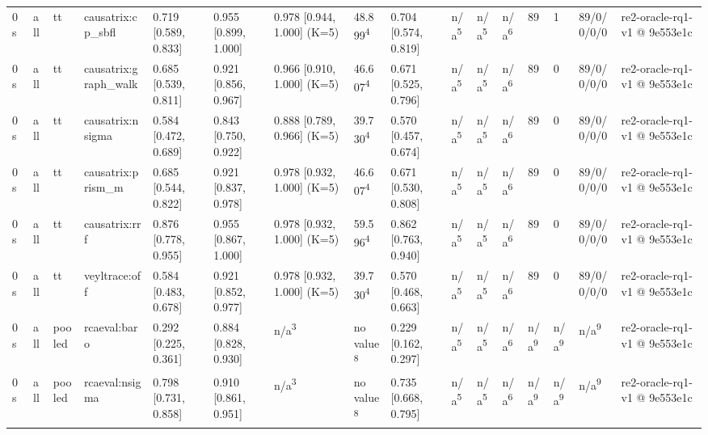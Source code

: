 \begin{table}[t]
\begin{tabular}{llllllllllllllll}
0 s & all & tt & causatrix:cp\_sbfl & 0.719 [0.589, 0.833] & 0.955 [0.899, 1.000] & 0.978 [0.944, 1.000] (K=5) & 48.899\textsuperscript{4} & 0.704 [0.574, 0.819] & n/a\textsuperscript{5} & n/a\textsuperscript{5} & n/a\textsuperscript{6} & 89 & 1 & 89/0/0/0/0 & re2-oracle-rq1-v1 @ 9e553e1c \\
0 s & all & tt & causatrix:graph\_walk & 0.685 [0.539, 0.811] & 0.921 [0.856, 0.967] & 0.966 [0.910, 1.000] (K=5) & 46.607\textsuperscript{4} & 0.671 [0.525, 0.796] & n/a\textsuperscript{5} & n/a\textsuperscript{5} & n/a\textsuperscript{6} & 89 & 0 & 89/0/0/0/0 & re2-oracle-rq1-v1 @ 9e553e1c \\
0 s & all & tt & causatrix:nsigma & 0.584 [0.472, 0.689] & 0.843 [0.750, 0.922] & 0.888 [0.789, 0.966] (K=5) & 39.730\textsuperscript{4} & 0.570 [0.457, 0.674] & n/a\textsuperscript{5} & n/a\textsuperscript{5} & n/a\textsuperscript{6} & 89 & 0 & 89/0/0/0/0 & re2-oracle-rq1-v1 @ 9e553e1c \\
0 s & all & tt & causatrix:prism\_m & 0.685 [0.544, 0.822] & 0.921 [0.837, 0.978] & 0.978 [0.932, 1.000] (K=5) & 46.607\textsuperscript{4} & 0.671 [0.530, 0.808] & n/a\textsuperscript{5} & n/a\textsuperscript{5} & n/a\textsuperscript{6} & 89 & 0 & 89/0/0/0/0 & re2-oracle-rq1-v1 @ 9e553e1c \\
0 s & all & tt & causatrix:rrf & 0.876 [0.778, 0.955] & 0.955 [0.867, 1.000] & 0.978 [0.932, 1.000] (K=5) & 59.596\textsuperscript{4} & 0.862 [0.763, 0.940] & n/a\textsuperscript{5} & n/a\textsuperscript{5} & n/a\textsuperscript{6} & 89 & 0 & 89/0/0/0/0 & re2-oracle-rq1-v1 @ 9e553e1c \\
0 s & all & tt & veyltrace:off & 0.584 [0.483, 0.678] & 0.921 [0.852, 0.977] & 0.978 [0.932, 1.000] (K=5) & 39.730\textsuperscript{4} & 0.570 [0.468, 0.663] & n/a\textsuperscript{5} & n/a\textsuperscript{5} & n/a\textsuperscript{6} & 89 & 0 & 89/0/0/0/0 & re2-oracle-rq1-v1 @ 9e553e1c \\
0 s & all & pooled & rcaeval:baro & 0.292 [0.225, 0.361] & 0.884 [0.828, 0.930] & n/a\textsuperscript{3} & no value\textsuperscript{8} & 0.229 [0.162, 0.297] & n/a\textsuperscript{5} & n/a\textsuperscript{5} & n/a\textsuperscript{6} & n/a\textsuperscript{9} & n/a\textsuperscript{9} & n/a\textsuperscript{9} & re2-oracle-rq1-v1 @ 9e553e1c \\
0 s & all & pooled & rcaeval:nsigma & 0.798 [0.731, 0.858] & 0.910 [0.861, 0.951] & n/a\textsuperscript{3} & no value\textsuperscript{8} & 0.735 [0.668, 0.795] & n/a\textsuperscript{5} & n/a\textsuperscript{5} & n/a\textsuperscript{6} & n/a\textsuperscript{9} & n/a\textsuperscript{9} & n/a\textsuperscript{9} & re2-oracle-rq1-v1 @ 9e553e1c \\

\end{tabular}
\end{table}
